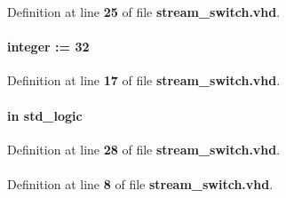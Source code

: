 Definition at line {\bf 25} of file {\bf stream\+\_\+switch.\+vhd}.

\paragraph[{data\+\_\+width}]{ {\bfseries \textcolor{vhdlchar}{ }} {\bfseries \textcolor{comment}{integer}\textcolor{vhdlchar}{ }\textcolor{vhdlchar}{ }\textcolor{vhdlchar}{\+:}\textcolor{vhdlchar}{=}\textcolor{vhdlchar}{ }\textcolor{vhdlchar}{ } \textcolor{vhdldigit}{32} \textcolor{vhdlchar}{ }} \hspace{0.3cm}{\ttfamily [Generic]}}\label{classstream__switch_a09dfdd4066a256170e0dc16676d1effe}


Definition at line {\bf 17} of file {\bf stream\+\_\+switch.\+vhd}.

\paragraph[{dest\+\_\+sel}]{ {\bfseries \textcolor{keywordflow}{in}\textcolor{vhdlchar}{ }} {\bfseries \textcolor{comment}{std\+\_\+logic}\textcolor{vhdlchar}{ }} \hspace{0.3cm}{\ttfamily [Port]}}\label{classstream__switch_a10a17227f1ea045651684e95b1b2d36d}


Definition at line {\bf 28} of file {\bf stream\+\_\+switch.\+vhd}.

\paragraph[{ieee}]{\hspace{0.3cm}{\ttfamily [Library]}}\label{classstream__switch_a0a6af6eef40212dbaf130d57ce711256}


Definition at line {\bf 8} of file {\bf stream\+\_\+switch.\+vhd}.

